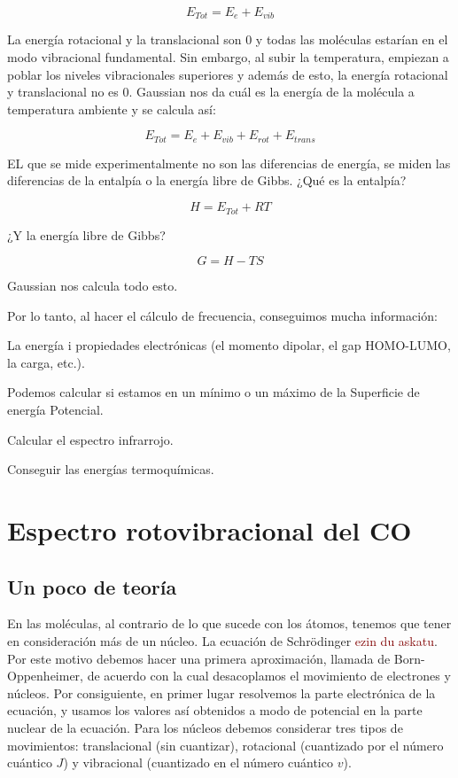 \documentclass{tufte-book}
\newcommand{\hlred}[1]{\textcolor{Maroon}{#1}}%
\begin{document}
\begin{equation}
    E_{Tot} = E_e+E_{vib}
\end{equation}

La energía rotacional y la translacional son 0 y todas las moléculas estarían en el modo vibracional fundamental. Sin embargo, al subir la temperatura, empiezan a poblar los niveles vibracionales superiores y además de esto, la energía rotacional y translacional no es 0. Gaussian nos da cuál es la energía de la molécula a temperatura ambiente y se calcula así:

\begin{equation}
    E_{Tot} = E_e+E_{vib}+E_{rot}+E_{trans}
\end{equation}

EL que se mide experimentalmente no son las diferencias de energía, se miden las diferencias de la entalpía o la energía libre de Gibbs. ¿Qué es la entalpía?

\begin{equation}
    H = E_{Tot}+RT
\end{equation}

¿Y la energía libre de Gibbs?

\begin{equation}
   G = H-TS
\end{equation}

Gaussian nos calcula todo esto. 

Por lo tanto, al hacer el cálculo de frecuencia, conseguimos mucha información:

\begin{list}{\textbullet}
\item La energía i propiedades electrónicas (el momento dipolar, el gap HOMO-LUMO, la carga, etc.).
\item Podemos calcular si estamos en un mínimo o un máximo de la Superficie de energía Potencial.
\item Calcular el espectro infrarrojo.
\item Conseguir las energías termoquímicas.
\end{list}


\chapter{Espectro rotovibracional del CO}

\section{Un poco de teoría}
En las moléculas, al contrario de lo que sucede con los átomos,
tenemos que tener en consideración más de un núcleo. La 
ecuación de Schrödinger \hlred{ezin du askatu}. Por este motivo
debemos hacer una primera aproximación, llamada de
Born-Oppenheimer, de acuerdo con la cual desacoplamos el
movimiento de electrones y núcleos. Por consiguiente, en 
primer lugar resolvemos la parte electrónica de la ecuación,
y usamos los valores así obtenidos a modo de potencial en la
parte nuclear de la ecuación. Para los núcleos debemos 
considerar tres tipos de movimientos: translacional (sin
cuantizar), rotacional (cuantizado por el número cuántico $J$)
y vibracional (cuantizado en el número cuántico $v$).
\end{document}
